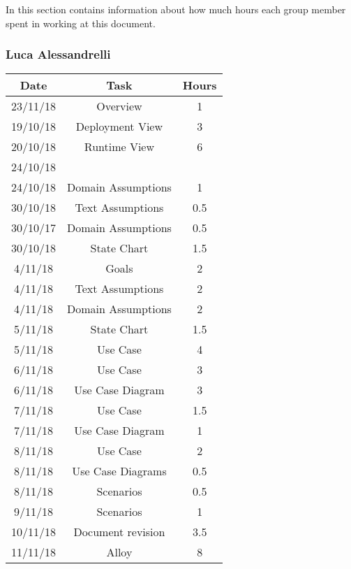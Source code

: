 In this section contains information about how much hours each group member spent in working at this document.
\bigbreak

\subsubsection{Luca Alessandrelli}
\begin{table}[h]
\centering
\begin{tabular}{|c|c|c|}
\hline
\rowcolor[HTML]{FE996B} 
Date & Task & Hours 
\\ \hline
\rowcolor[HTML]{FFFC9E} 
23/11/18  & Overview & 1  
\\ \hline
\rowcolor[HTML]{FFFC9E} 
19/10/18 & Deployment View & 3  
\\ \hline
\rowcolor[HTML]{FFFC9E}
20/10/18 & Runtime View & 6 
\\ \hline
\rowcolor[HTML]{FFFC9E}
24/10/18 & & 
\\ \hline
\rowcolor[HTML]{FFFC9E}
24/10/18 & Domain Assumptions & 1
\\ \hline
\rowcolor[HTML]{FFFC9E}
30/10/18 & Text Assumptions & 0.5
\\ \hline
\rowcolor[HTML]{FFFC9E}
30/10/17 & Domain Assumptions & 0.5
\\ \hline
\rowcolor[HTML]{FFFC9E}
30/10/18 & State Chart & 1.5
\\ \hline
\rowcolor[HTML]{FFFC9E}
4/11/18 & Goals & 2
\\ \hline
\rowcolor[HTML]{FFFC9E}
4/11/18 & Text Assumptions & 2
\\ \hline
\rowcolor[HTML]{FFFC9E}
4/11/18 & Domain Assumptions & 2
\\ \hline
\rowcolor[HTML]{FFFC9E}
5/11/18 & State Chart & 1.5
\\ \hline
\rowcolor[HTML]{FFFC9E}
5/11/18 & Use Case & 4
\\ \hline
\rowcolor[HTML]{FFFC9E}
6/11/18 & Use Case & 3
\\ \hline
\rowcolor[HTML]{FFFC9E}
6/11/18 & Use Case Diagram & 3
\\ \hline
\rowcolor[HTML]{FFFC9E}
7/11/18 & Use Case & 1.5
\\ \hline
\rowcolor[HTML]{FFFC9E}
7/11/18 & Use Case Diagram & 1
\\ \hline
\rowcolor[HTML]{FFFC9E}
8/11/18 & Use Case & 2
\\ \hline
\rowcolor[HTML]{FFFC9E}
8/11/18 & Use Case Diagrams & 0.5
\\ \hline
\rowcolor[HTML]{FFFC9E}
8/11/18 & Scenarios & 0.5
\\ \hline
\rowcolor[HTML]{FFFC9E}
9/11/18 & Scenarios & 1
\\ \hline
\rowcolor[HTML]{FFFC9E}
10/11/18 & Document revision & 3.5
\\ \hline
\rowcolor[HTML]{FFFC9E}
11/11/18 & Alloy & 8
\\ \hline


\end{tabular}
\end{table}
